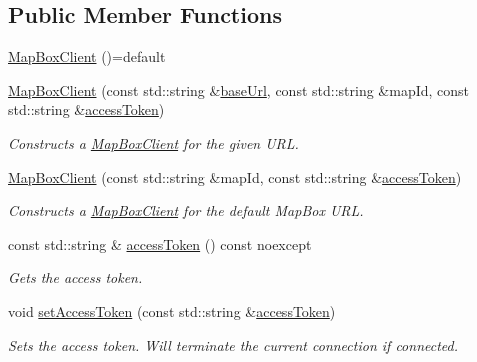 \subsection*{Public Member Functions}
\begin{DoxyCompactItemize}
\item 
\hyperlink{classdg_1_1deepcore_1_1imagery_1_1_map_box_client_a70e2f2865377dfdf9bc35c87b4506c97}{Map\+Box\+Client} ()=default
\item 
\hyperlink{group___imagery_module_ga1377794e139dc1d5042a91da0f31a382}{Map\+Box\+Client} (const std\+::string \&\hyperlink{group___imagery_module_gadf279770cec6dc9ac56348bb2e1b29e1}{base\+Url}, const std\+::string \&map\+Id, const std\+::string \&\hyperlink{group___imagery_module_ga09b8428dd2d706d2816a06509cdefdf3}{access\+Token})
\begin{DoxyCompactList}\small\item\em Constructs a \hyperlink{classdg_1_1deepcore_1_1imagery_1_1_map_box_client}{Map\+Box\+Client} for the given U\+RL. \end{DoxyCompactList}\item 
\hyperlink{group___imagery_module_ga9258467b609a2dad474905cd984f4451}{Map\+Box\+Client} (const std\+::string \&map\+Id, const std\+::string \&\hyperlink{group___imagery_module_ga09b8428dd2d706d2816a06509cdefdf3}{access\+Token})
\begin{DoxyCompactList}\small\item\em Constructs a \hyperlink{classdg_1_1deepcore_1_1imagery_1_1_map_box_client}{Map\+Box\+Client} for the default Map\+Box U\+RL. \end{DoxyCompactList}\item 
const std\+::string \& \hyperlink{group___imagery_module_ga09b8428dd2d706d2816a06509cdefdf3}{access\+Token} () const noexcept
\begin{DoxyCompactList}\small\item\em Gets the access token. \end{DoxyCompactList}\item 
void \hyperlink{group___imagery_module_ga24970dc0f6164b6592cb6a97bab71e15}{set\+Access\+Token} (const std\+::string \&\hyperlink{group___imagery_module_ga09b8428dd2d706d2816a06509cdefdf3}{access\+Token})
\begin{DoxyCompactList}\small\item\em Sets the access token. Will terminate the current connection if connected. \end{DoxyCompactList}\item 

\end{DoxyCompactItemize}

